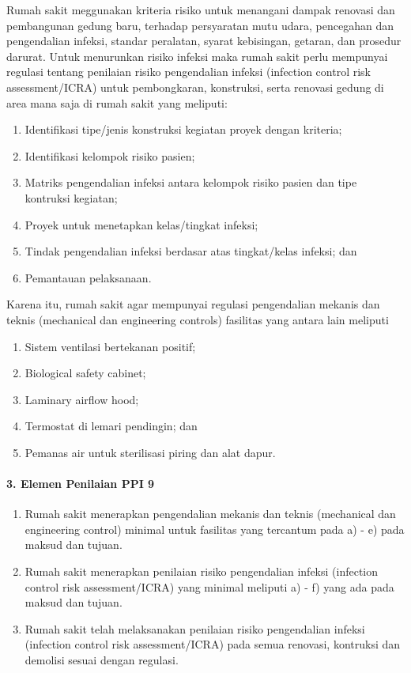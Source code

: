 \documentclass[
]{book}
\providecommand{\tightlist}{%
  \setlength{\itemsep}{0pt}\setlength{\parskip}{0pt}}
\begin{document}
Rumah sakit meggunakan kriteria risiko untuk menangani dampak renovasi dan pembangunan gedung baru, terhadap persyaratan mutu udara, pencegahan dan pengendalian infeksi, standar peralatan, syarat kebisingan, getaran, dan prosedur darurat. Untuk menurunkan risiko infeksi maka rumah sakit perlu mempunyai regulasi tentang penilaian risiko pengendalian infeksi (infection control risk assessment/ICRA) untuk pembongkaran, konstruksi, serta renovasi gedung di area mana saja di rumah sakit yang meliputi:

\begin{enumerate}
\def\labelenumi{\alph{enumi}.}
\tightlist
\item
  Identifikasi tipe/jenis konstruksi kegiatan proyek dengan kriteria;
\item
  Identifikasi kelompok risiko pasien;
\item
  Matriks pengendalian infeksi antara kelompok risiko pasien dan tipe kontruksi kegiatan;
\item
  Proyek untuk menetapkan kelas/tingkat infeksi;
\item
  Tindak pengendalian infeksi berdasar atas tingkat/kelas infeksi; dan
\item
  Pemantauan pelaksanaan.
\end{enumerate}

Karena itu, rumah sakit agar mempunyai regulasi pengendalian mekanis dan teknis (mechanical dan engineering controls) fasilitas yang antara lain meliputi

\begin{enumerate}
\def\labelenumi{\alph{enumi}.}
\tightlist
\item
  Sistem ventilasi bertekanan positif;
\item
  Biological safety cabinet;
\item
  Laminary airflow hood;
\item
  Termostat di lemari pendingin; dan
\item
  Pemanas air untuk sterilisasi piring dan alat dapur.
\end{enumerate}

\hypertarget{elemen-penilaian-ppi-9}{%
\paragraph*{3. Elemen Penilaian PPI 9}\label{elemen-penilaian-ppi-9}}

\begin{enumerate}
\def\labelenumi{\alph{enumi}.}
\tightlist
\item
  Rumah sakit menerapkan pengendalian mekanis dan teknis (mechanical dan engineering control) minimal untuk fasilitas yang tercantum pada a) - e) pada maksud dan tujuan.
\item
  Rumah sakit menerapkan penilaian risiko pengendalian infeksi (infection control risk assessment/ICRA) yang minimal meliputi a) - f) yang ada pada maksud dan tujuan.
\item
  Rumah sakit telah melaksanakan penilaian risiko pengendalian infeksi (infection control risk assessment/ICRA) pada semua renovasi, kontruksi dan demolisi sesuai dengan regulasi.
\end{enumerate}
\end{document}
